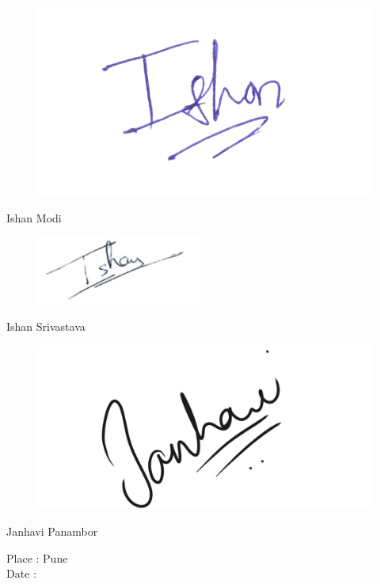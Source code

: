 \begin{raggedright}
\begin{figure}[H]
\begin{flushleft}
  \includegraphics[scale=0.12]{Photos/Ishan_m_sign.jpeg}
\end{flushleft}
\end{figure}
Ishan Modi\\ 
\begin{figure}[H]
\begin{flushleft}
  \includegraphics[scale=0.5]{Photos/Ishan_s_sign.jpeg}
\end{flushleft}
\end{figure}
Ishan Srivastava\\ 
\begin{figure}[H]
\begin{flushleft}
  \includegraphics[scale=0.1]{Photos/Janhavi_p_sign.jpeg}
\end{flushleft}
\end{figure}
Janhavi Panambor\\
\end{raggedright}


\noindent Place : Pune \\
Date :


